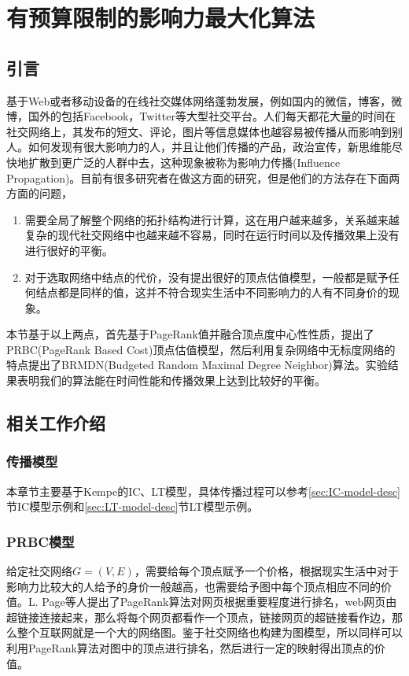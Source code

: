 

\chapter{有预算限制的影响力最大化算法}
\label{cha:3thChap03}

\section{引言}
基于Web或者移动设备的在线社交媒体网络蓬勃发展，例如国内的微信，博客，微博，国外的包括Facebook，Twitter等大型社交平台。人们每天都花大量的时间在社交网络上，其发布的短文、评论，图片等信息媒体也越容易被传播从而影响到别人。如何发现有很大影响力的人，并且让他们传播的产品，政治宣传，新思维能尽快地扩散到更广泛的人群中去，这种现象被称为影响力传播(Influence Propagation)。目前有很多研究者在做这方面的研究，但是他们的方法存在下面两方面的问题，
\begin{enumerate}
\item 需要全局了解整个网络的拓扑结构进行计算，这在用户越来越多，关系越来越复杂的现代社交网络中也越来越不容易，同时在运行时间以及传播效果上没有进行很好的平衡。
\item 对于选取网络中结点的代价，没有提出很好的顶点估值模型，一般都是赋予任何结点都是同样的值，这并不符合现实生活中不同影响力的人有不同身价的现象。
\end{enumerate}
本节基于以上两点，首先基于PageRank值并融合顶点度中心性性质，提出了PRBC(PageRank Based Cost)顶点估值模型，然后利用复杂网络中无标度网络的特点提出了BRMDN(Budgeted Random Maximal Degree Neighbor)算法。实验结果表明我们的算法能在时间性能和传播效果上达到比较好的平衡。


\section{相关工作介绍}
\subsection{传播模型}
本章节主要基于Kempe\cite{kempe2003maximizing}的IC、LT模型，具体传播过程可以参考\ref{sec:IC-model-desc}节IC模型示例和\ref{sec:LT-model-desc}节LT模型示例。


\subsection{PRBC模型}
\label{sec:chap3:cost-model}
给定社交网络$G=(V, E)$，需要给每个顶点赋予一个价格，根据现实生活中对于影响力比较大的人给予的身价一般越高，也需要给予图中每个顶点相应不同的价值。L. Page\cite{page1999pagerank}等人提出了PageRank算法对网页根据重要程度进行排名，web网页由超链接连接起来，那么将每个网页都看作一个顶点，链接网页的超链接看作边，那么整个互联网就是一个大的网络图。鉴于社交网络也构建为图模型，所以同样可以利用PageRank算法对图中的顶点进行排名，然后进行一定的映射得出顶点的价值。


